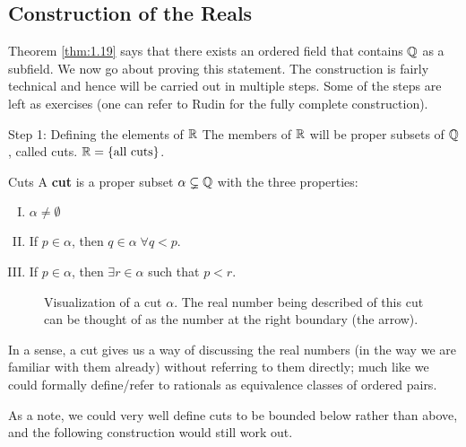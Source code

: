 \subsection{Construction of the Reals}
Theorem \ref{thm:1.19} says that there exists an ordered field that contains $\mathbb{Q}$ as a subfield. We now go about proving this statement. The construction is fairly technical and hence will be carried out in multiple steps. Some of the steps are left as exercises (one can refer to Rudin for the fully complete construction).

\begin{nblank}{Step 1: Defining the elements of $\mathbb{R}$}
    The members of $\mathbb{R}$ will be proper subsets of $\mathbb{Q}$, called cuts. $\mathbb{R} = \set{\text{all cuts}}$. 
    \begin{ndef}{Cuts}
        A \textbf{cut} is a proper subset $\alpha \subsetneq \mathbb{Q}$ with the three properties:
        \begin{enumerate}[(I)]
            \item $\alpha \neq \emptyset$
            \item If $p \in \alpha$, then $q \in \alpha \; \forall q < p$. 
            \item If $p \in \alpha$, then $\exists r \in \alpha$ such that $p < r$. 
        \end{enumerate}
    \end{ndef}
\end{nblank}
\begin{figure}[htbp]
    \centering
    \caption{Visualization of a cut $\alpha$. The real number being described of this cut can be thought of as the number at the right boundary (the arrow).}
    \label{fig2} 
\end{figure}
\noindent In a sense, a cut gives us a way of discussing the real numbers (in the way we are familiar with them already) without referring to them directly; much like we could formally define/refer to rationals as equivalence classes of ordered pairs.  

\noindent As a note, we could very well define cuts to be bounded below rather than above, and the following construction would still work out.

